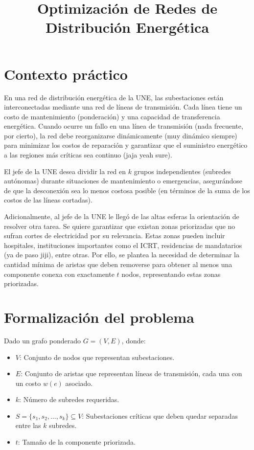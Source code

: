 \documentclass[a4paper, 12pt]{article}
\title{\textbf{Optimización de Redes de Distribución Energética}}
\author{}
\date{}
\begin{document}
\maketitle

\section*{Contexto práctico}
En una red de distribución energética de la UNE, 
las subestaciones están interconectadas mediante 
una red de líneas de transmisión. Cada línea tiene 
un costo de mantenimiento (ponderación) y una 
capacidad de transferencia energética. 
Cuando ocurre un fallo en una línea de transmisión 
(nada frecuente, por cierto), 
la red debe reorganizarse dinámicamente (muy dinámico siempre) 
para minimizar los costos de reparación y garantizar 
que el suministro energético a las regiones más 
críticas sea continuo (jaja yeah sure).

El jefe de la UNE desea dividir la red en \( k \) 
grupos independientes (subredes autónomas) durante 
situaciones de mantenimiento o emergencias, 
asegurándose de que la desconexión sea lo menos 
costosa posible (en términos de la suma de los 
costos de las líneas cortadas).

Adicionalmente, al jefe de la UNE le llegó de las altas esferas
la orientación de resolver otra tarea. 
Se quiere garantizar que existan zonas priorizadas que 
no sufran cortes de electricidad por su relevancia. 
Estas zonas pueden incluir hospitales, instituciones importantes como el ICRT, 
residencias de mandatarios (ya de paso jiji), entre otras. 
Por ello, se plantea la necesidad de determinar la 
cantidad mínima de aristas que deben removerse para 
obtener al menos una componente conexa con 
exactamente \( t \) nodos, representando estas zonas 
priorizadas.

\section*{Formalización del problema}
Dado un grafo ponderado \( G = (V, E) \), donde:
\begin{itemize}
    \item \( V \): Conjunto de nodos que representan subestaciones.
    \item \( E \): Conjunto de aristas que representan líneas de transmisión, cada una con un costo \( w(e) \) asociado.
    \item \( k \): Número de subredes requeridas.
    \item \( S = \{s_1, s_2, \dots, s_k\} \subseteq V \): Subestaciones críticas que deben quedar separadas entre las \( k \) subredes.
    \item \( t \): Tamaño de la componente priorizada.
\end{itemize}
\end{document}
